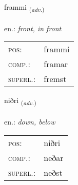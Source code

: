 \documentclass[frontgrid, backgrid]{flacards}\usepackage[]{graphicx}\usepackage[]{xcolor}
\begin{document}
\renewcommand{\flhead}{\vskip5pt \fboxsep=0pt {\small\bfseries\footnotesize Atviksorð | Adverb}}
\renewcommand{\fcfoot}{\vskip5pt \fboxsep=0pt \hspace{2pt}{\small\bfseries\footnotesize 2K}}

\renewcommand{\blhead}{\vskip5pt {\small\bfseries\footnotesize Atviksorð | Adverb }}
\renewcommand{\bcfoot}{\vskip5pt \hspace{2pt}{\small\bfseries\footnotesize 2K}}


{frammi \small{\textsubscript{(\textit{adv.})}} \\[1ex] %
\textphonetic{[framɪ]} \\
en.: \emph{front, in front} \\  [2ex]
\renewcommand*{\arraystretch}{0.8}
\begin{tabular}{ll}
\textsc{pos}: & frammi \\ 
\textsc{comp.}: & framar \\ 
\textsc{superl.}: & fremst \\
\end{tabular}
}

\renewcommand{\flhead}{\vskip5pt \fboxsep=0pt {\small\bfseries\footnotesize Atviksorð | Adverb}}
\renewcommand{\fcfoot}{\vskip5pt \fboxsep=0pt \hspace{2pt}{\small\bfseries\footnotesize 2K}}

\renewcommand{\blhead}{\vskip5pt {\small\bfseries\footnotesize Atviksorð | Adverb }}
\renewcommand{\bcfoot}{\vskip5pt \hspace{2pt}{\small\bfseries\footnotesize 2K}}


{niðri \small{\textsubscript{(\textit{adv.})}} \\[1ex] %
\textphonetic{[nɪðrɪ]} \\
en.: \emph{down, below} \\  [2ex]
\renewcommand*{\arraystretch}{0.8}
\begin{tabular}{ll}
\textsc{pos}: & niðri \\ 
\textsc{comp.}: & neðar \\ 
\textsc{superl.}: & neðst \\
\end{tabular}
}
\end{document}
